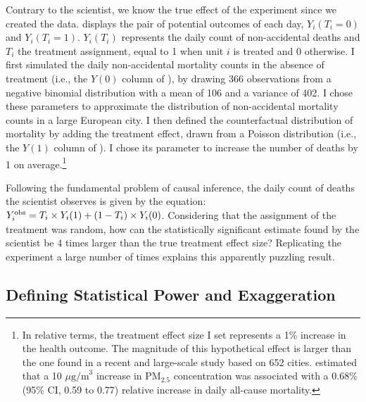 \documentclass[12pt]{article}
\begin{document}
    Contrary to the scientist, we know the true effect of the experiment since we created the data.  displays the pair of potential outcomes of each day, $Y_{i}(T_{i}=0)$ and $Y_{i}(T_{i}=1)$. $Y_{i}(T_{i})$ represents the daily count of non-accidental deaths and $T_{i}$ the treatment assignment, equal to 1 when unit $i$ is treated and 0 otherwise. I first simulated the daily non-accidental mortality counts in the absence of treatment (i.e., the $Y(0)$ column of ), by drawing 366 observations from a negative binomial distribution with a mean of 106 and a variance of 402. I chose these parameters to approximate the distribution of non-accidental mortality counts in a large European city. I then defined the counterfactual distribution of mortality by adding the treatment effect, drawn from a Poisson distribution (i.e., the $Y(1)$ column of ). I chose its parameter to increase the number of deaths by 1 on average.\footnote{In relative terms, the treatment effect size I set represents a 1\% increase in the health outcome. The magnitude of this hypothetical effect is larger than the one found in a recent and large-scale study based on 652 cities. \cite{liu_ambient_2019} estimated that a 10 $\mu \text{g/m}^3$ increase in $\text{PM}_{2.5}$ concentration was associated with a 0.68\% (95\% CI, 0.59 to 0.77) relative increase in daily all-cause mortality.}

    

    Following the fundamental problem of causal inference, the daily count of deaths the scientist observes is given by the equation: $Y_{i}^{\textnormal{obs}} = T_{i} \times Y_{i}(1) + (1-T_{i})\times Y_{i}(0)$. Considering that the assignment of the treatment was random, how can the statistically significant estimate found by the scientist be 4 times larger than the true treatment effect size? Replicating the experiment a large number of times explains this apparently puzzling result.
   
        \begin{sloppypar}
    \subsection{Defining Statistical Power and Exaggeration}
        \end{sloppypar}
\end{document}
